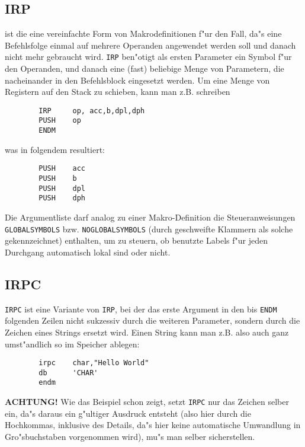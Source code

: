 \documentclass[12pt,a4paper,twoside]{report}
\makeatletter
\newcommand{\bb}[1]{{\bf #1}}
\newcommand{\tty}[1]{{\tt #1}}
\newcommand{\ttindex}[1]{\index{#1@{\tt #1}}}
\makeatother
\begin{document}
{%

\subsection{IRP}
\ttindex{IRP}

ist die eine vereinfachte Form von Makrodefinitionen f"ur den Fall,
da"s eine Befehlsfolge einmal auf mehrere Operanden angewendet werden
soll und danach nicht mehr gebraucht wird.  \tty{IRP} ben"otigt als ersten
Parameter ein Symbol f"ur den Operanden, und danach eine (fast)
beliebige Menge von Parametern, die nacheinander in den Befehlsblock
eingesetzt werden.  Um eine Menge von Registern auf den Stack zu
schieben, kann man z.B. schreiben
\begin{verbatim}
        IRP     op, acc,b,dpl,dph
        PUSH    op
        ENDM
\end{verbatim}
was in folgendem resultiert:
\begin{verbatim}
        PUSH    acc
        PUSH    b
        PUSH    dpl
        PUSH    dph
\end{verbatim}
Die Argumentliste darf analog zu einer Makro-Definition die
Steueranweisungen \tty{GLOBALSYMBOLS} bzw. \tty{NOGLOBALSYMBOLS} (durch
geschweifte Klammern als solche gekennzeichnet) enthalten, um zu
steuern, ob benutzte Labels f"ur jeden Durchgang automatisch lokal
sind oder nicht.


\subsection{IRPC}
\ttindex{IRPC}

\tty{IRPC} ist eine Variante von \tty{IRP}, bei der das erste Argument in
den bis \tty{ENDM} folgenden Zeilen nicht sukzessiv durch die weiteren
Parameter, sondern durch die Zeichen eines Strings ersetzt wird.  Einen
String kann man z.B. also auch ganz umst"andlich so im Speicher ablegen:
\begin{verbatim}
        irpc    char,"Hello World"
        db      'CHAR'
        endm
\end{verbatim}
\bb{ACHTUNG!} Wie das Beispiel schon zeigt, setzt \tty{IRPC} nur das
Zeichen selber ein, da"s daraus ein g"ultiger Ausdruck entsteht (also hier
durch die Hochkommas, inklusive des Details, da"s hier keine automatische
Umwandlung in Gro"sbuchstaben vorgenommen wird), mu"s man selber
sicherstellen.

}
\end{document}
